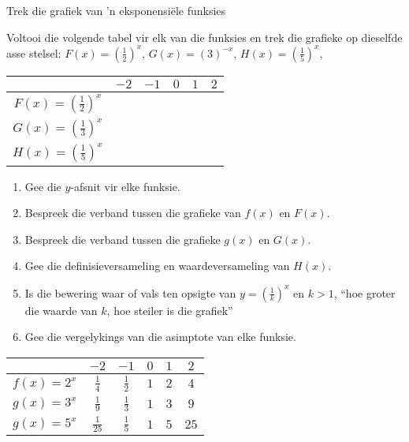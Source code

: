 \begin{wex}{Trek die grafiek van 'n eksponensiële funksies}
{Voltooi die volgende tabel vir elk van die funksies en trek die grafieke op dieselfde asse stelsel:
$F(x) =(\frac{1}{2})^{x}$, $G(x) =(3)^{-x}$, $H(x) =(\frac{1}{5})^{x}$, 
\begin{table}[H]
\begin{center}
\begin{tabular}{|c|c|c|c|c|c|}
\hline
   &  $-2$ & $-1$ & $0$ & $1$ & $2$ 
\\ \hline
$F(x)=(\frac{1}{2})^{x}$&  \hspace{1cm}  & \hspace{1cm} & \hspace{1cm} & \hspace{1cm} & \hspace{1cm} 
\\ \hline
$G(x)=(\frac{1}{3})^{x}$&  &&&&
\\ \hline
$H(x)=(\frac{1}{5})^{x}$&  &&&&
\\ \hline

\end{tabular}
\end{center}
\end{table}

\begin{enumerate}[noitemsep, label=\textbf{\arabic*}. ] 
\item Gee die $y$-afsnit vir elke funksie.
\item Bespreek die verband tussen die grafieke van $f(x)$ en $F(x)$.
\item Bespreek die verband tussen die grafieke $g(x)$ en $G(x)$.
\item Gee die definisieversameling en waardeversameling van $H(x)$.
\item Is die bewering waar of vals ten opsigte van $y=(\frac{1}{k})^{x}$ en $k>1$, ``hoe groter die waarde van $k$, hoe steiler is die grafiek''
\item Gee die vergelykings van die asimptote van elke funksie.
\end{enumerate}

}
{
\begin{table}[H]
\begin{center}
\begin{tabular}{|c|c|c|c|c|c|}
\hline
   &  $-2$ & $-1$ & $0$ & $1$ & $2$ 
\\ \hline
 $f(x)=2^{x}$& $\frac{1}{4}$ &$\frac{1}{2}$&$1$&$2$&$4$
\\ \hline
 $g(x)=3^{x}$& $\frac{1}{9}$ &$\frac{1}{3}$&$1$&$3$&$9$
\\ \hline
 $g(x)=5^{x}$& $\frac{1}{25}$ &$\frac{1}{5}$&$1$&$5$&$25$
\\ \hline


\end{tabular}
\end{center}
\end{table}}
\end{wex}
